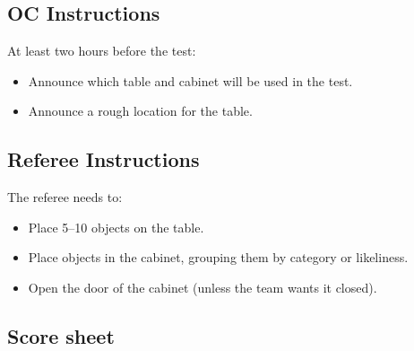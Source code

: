 \subsection*{OC Instructions}

At least two hours before the test:
\begin{itemize}
	\item Announce which table and cabinet will be used in the test.
	\item Announce a rough location for the table.
\end{itemize}

\subsection*{Referee Instructions}

The referee needs to:
\begin{itemize}
	\item Place 5--10 objects on the table.
	\item Place objects in the cabinet, grouping them by category or likeliness.
	\item Open the door of the cabinet (unless the team wants it closed).
\end{itemize}


\subsection*{Score sheet}


